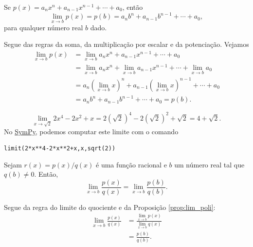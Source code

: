 \begin{prop}\label{prop:lim_poli}
  Se $p(x) = a_nx^n + a_{n-1}x^{n-1} + \cdots + a_0$, então
  \begin{equation}
    \lim_{x\to b} p(x) = p(b) = a_nb^n + a_{n-1}b^{n-1} + \cdots + a_0,
  \end{equation}
  para qualquer número real $b$ dado.
\end{prop}
\begin{dem}
  Segue das regras da soma, da multiplicação por escalar e da potenciação. Vejamos
  \begin{align}
    \lim_{x\to b} p(x) &= \lim_{x\to b} a_nx^n + a_{n-1}x^{n-1} + \cdots + a_0\\
                       &= \lim_{x\to b} a_nx^n + \lim_{x\to b} a_{n-1}x^{n-1} + \cdots + \lim_{x\to b} a_0\\
                       &= a_n\left(\lim_{x\to b} x\right)^n + a_{n-1}\left(\lim_{x\to b} x\right)^{n-1} + \cdots + a_0\\
                       &= a_nb^n + a_{n-1}b^{n-1} + \cdots + a_0 = p(b).
  \end{align}
\end{dem}

\begin{ex}
  \begin{equation}
    \lim_{x\to \sqrt{2}} 2x^4 - 2x^2 + x = 2(\sqrt{2})^4 - 2(\sqrt{2})^2 + \sqrt{2} = 4+\sqrt{2}.
  \end{equation}
  \ifispython
  No \href{https://www.sympy.org}{SymPy}, podemos computar este limite com o comando
\begin{verbatim}
limit(2*x**4-2*x**2+x,x,sqrt(2))
\end{verbatim}
  \fi
\end{ex}

\begin{prop}
  Sejam $r(x) = p(x)/q(x)$ é uma função racional e $b$ um número real tal que $q(b)\neq 0$. Então,
  \begin{equation}
    \lim_{x\to b} \frac{p(x)}{q(x)} = \lim_{x\to b} \frac{p(b)}{q(b)}.
  \end{equation}
\end{prop}
\begin{dem}
  Segue da regra do limite do quociente e da Proposição \ref{prop:lim_poli}:
  \begin{align}
    \lim_{x\to b} \frac{p(x)}{q(x)} &= \frac{\lim_{x\to b} p(x)}{\lim_{x\to b} q(x)} \\
    &= \frac{p(b)}{q(b)}.
  \end{align}
\end{dem}


